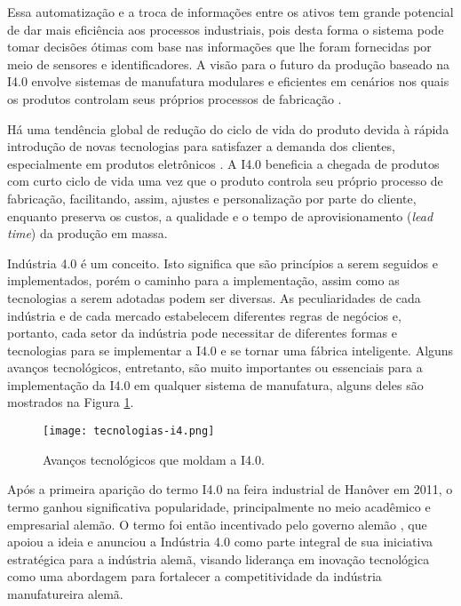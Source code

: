 	Essa automatização e a troca de informações entre os ativos tem grande potencial de dar mais eficiência aos processos industriais, pois desta forma o sistema pode tomar decisões ótimas com base nas informações que lhe foram fornecidas por meio de sensores e identificadores. A visão para o futuro da produção baseado na I4.0 envolve sistemas de manufatura modulares e eficientes em cenários nos quais os produtos controlam seus próprios processos de fabricação \cite{lasi2014industryfour}.
	
	Há uma tendência global de redução do ciclo de vida do produto devida à rápida introdução de novas tecnologias para satisfazer a demanda dos clientes, especialmente em produtos eletrônicos \cite{trappey2008lifecycle}. A I4.0 beneficia a chegada de produtos com curto ciclo de vida uma vez que o produto controla seu próprio processo de fabricação, facilitando, assim, ajustes e personalização por parte do cliente, enquanto preserva os custos, a qualidade e o tempo de aprovisionamento (\textit{lead time}) da produção em massa.
	
	Indústria 4.0 é um conceito. Isto significa que são princípios a serem seguidos e implementados, porém o caminho para a implementação, assim como as tecnologias a serem adotadas podem ser diversas. As peculiaridades de cada indústria e de cada mercado estabelecem diferentes regras de negócios e, portanto, cada setor da indústria pode necessitar de diferentes formas e tecnologias para se implementar a I4.0 e se tornar uma fábrica inteligente. Alguns avanços tecnológicos, entretanto, são muito importantes ou essenciais para a implementação da I4.0 em qualquer sistema de manufatura, alguns deles são mostrados na Figura \ref{fig:tecnologias-i4}.
	
	\begin{figure}[hbt!]
		\centering
		\caption{Avanços tecnológicos que moldam a I4.0.}
		\texttt{[image: tecnologias-i4.png]}
		\label{fig:tecnologias-i4}
	\end{figure}

	Após a primeira aparição do termo I4.0 na feira industrial de Hanôver em 2011, o termo ganhou significativa popularidade, principalmente no meio acadêmico e empresarial alemão. O termo foi então incentivado pelo governo alemão \cite{lasi2014industryfour, kagermann2013recommendations}, que apoiou a ideia e anunciou a Indústria 4.0 como parte integral de sua iniciativa estratégica para a indústria alemã, visando liderança em inovação tecnológica \cite{drath2014industrie} como uma abordagem para fortalecer a competitividade da indústria manufatureira alemã.	

